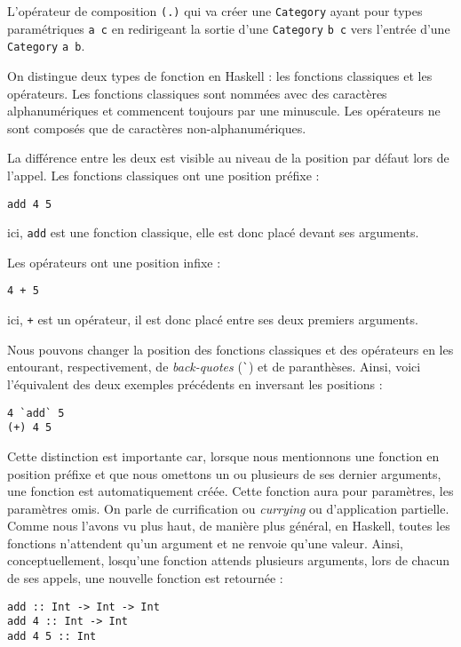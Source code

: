 \documentclass{llncs}
\begin{document}
L'opérateur de composition \lstinline{(.)} qui va créer une \lstinline{Category}
ayant pour types paramétriques \lstinline{a c} en redirigeant la sortie d'une
\lstinline{Category} \lstinline{b c} vers l'entrée d'une \lstinline{Category} \lstinline{a b}.

On distingue deux types de fonction en Haskell : les fonctions classiques et les opérateurs.
Les fonctions classiques sont nommées avec des caractères alphanumériques et commencent
toujours par une minuscule.
Les opérateurs ne sont composés que de caractères non-alphanumériques.

La différence entre les deux est visible au niveau de la position par défaut lors
de l'appel.
Les fonctions classiques ont une position préfixe :
\begin{lstlisting}
add 4 5
\end{lstlisting}

ici, \lstinline{add} est une fonction classique, elle est donc placé devant ses
arguments.

Les opérateurs ont une position infixe :
\begin{lstlisting}
4 + 5
\end{lstlisting}

ici, \lstinline{+} est un opérateur, il est donc placé entre ses deux premiers
arguments.

Nous pouvons changer la position des fonctions classiques et des opérateurs en
les entourant, respectivement, de \emph{back-quotes} (\lstinline{`}) et de paranthèses.
Ainsi, voici l'équivalent des deux exemples précédents en inversant les positions :
\begin{lstlisting}
4 `add` 5
(+) 4 5
\end{lstlisting}

Cette distinction est importante car, lorsque nous mentionnons une fonction en position
préfixe et que nous omettons un ou plusieurs de ses dernier arguments, une fonction
est automatiquement créée.
Cette fonction aura pour paramètres, les paramètres omis.
On parle de currification ou \emph{currying} ou d'application partielle.
Comme nous l'avons vu plus haut, de manière plus général, en Haskell, toutes les
fonctions n'attendent qu'un argument et ne renvoie qu'une valeur.
Ainsi, conceptuellement, losqu'une fonction attends plusieurs arguments, lors de
chacun de ses appels, une nouvelle fonction est retournée :
\begin{lstlisting}
add :: Int -> Int -> Int
add 4 :: Int -> Int
add 4 5 :: Int
\end{lstlisting}
\end{document}
